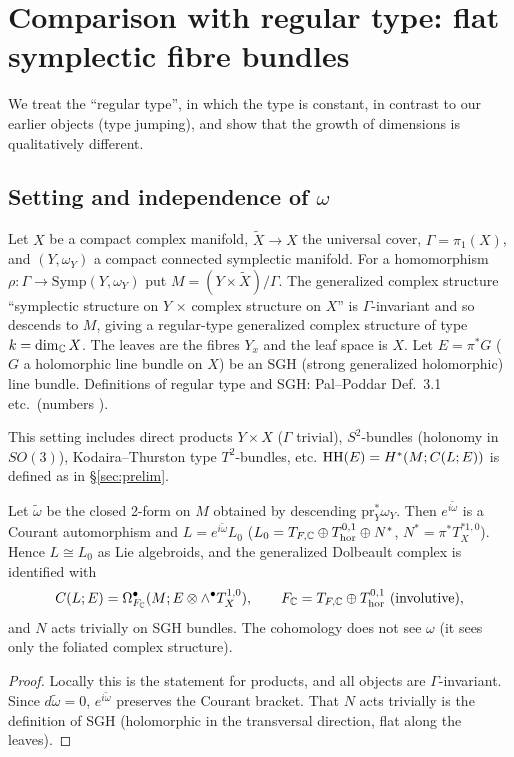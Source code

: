 \section{Comparison with regular type: flat symplectic fibre bundles}\label{sec:regular}
We treat the ``regular type'', in which the type is constant, in contrast to our earlier objects (type jumping), and show that the growth of dimensions is qualitatively different.

\subsection{Setting and independence of $\omega$}
\begin{defn}[Setting (S)]\label{defn:S}
Let $X$ be a compact complex manifold, $\tilde X\to X$ the universal cover, $\Gamma=\pi_1(X)$, and $(Y,\omega_Y)$ a compact connected symplectic manifold. For a homomorphism $\rho:\Gamma\to\mathrm{Symp}(Y,\omega_Y)$ put $M=(Y\times\tilde X)/\Gamma$. The generalized complex structure ``symplectic structure on $Y$ $\times$ complex structure on $X$'' is $\Gamma$-invariant and so descends to $M$, giving a regular-type generalized complex structure of type $k=\dim_\mathbb C X$. The leaves are the fibres $Y_x$ and the leaf space is $X$. Let $E=\pi^*G$ ($G$ a holomorphic line bundle on $X$) be an SGH (strong generalized holomorphic) line bundle. \tC Definitions of regular type and SGH: Pal--Poddar \cite{PP} Def.\ 3.1 etc.\ (numbers \tQ).
\end{defn}
This setting includes direct products $Y\times X$ ($\Gamma$ trivial), $S^2$-bundles (holonomy in $SO(3)$), Kodaira--Thurston type $T^2$-bundles, etc. $\mathrm{HH}(E)=H^*(M;C(L;E))$ is defined as in \S\ref{sec:prelim}.

\begin{prop}\tP\label{prop:omega}
Let $\tilde\omega$ be the closed 2-form on $M$ obtained by descending $\mathrm{pr}_Y^*\omega_Y$. Then $e^{i\tilde\omega}$ is a Courant automorphism and $L=e^{i\tilde\omega}L_0$ ($L_0=T_{F,\mathbb C}\oplus T^{0,1}_{\mathrm{hor}}\oplus N^*$, $N^*=\pi^*T^{*1,0}_X$). Hence $L\cong L_0$ as Lie algebroids, and the generalized Dolbeault complex is identified with
\[C(L;E)=\Omega^\bullet_{F_\C}(M;E\otimes\wedge^\bullet T^{1,0}_X),\qquad F_\C=T_{F,\C}\oplus T^{0,1}_{\mathrm{hor}}\ (\text{involutive}),\]
and $N$ acts trivially on SGH bundles. The cohomology does not see $\omega$ (it sees only the foliated complex structure).
\end{prop}
\begin{proof}
Locally this is the statement for products, and all objects are $\Gamma$-invariant. Since $d\tilde\omega=0$, $e^{i\tilde\omega}$ preserves the Courant bracket. That $N$ acts trivially is the definition of SGH (holomorphic in the transversal direction, flat along the leaves). \qedhere
\end{proof}

